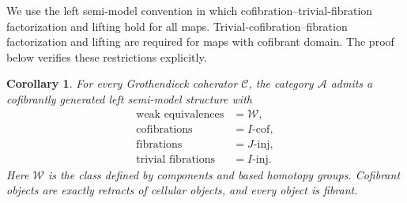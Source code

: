 \documentclass[11pt,letterpaper]{article}
\numberwithin{equation}{section}
\theoremstyle{plain}
\newtheorem{corollary}[theorem]{Corollary}
\theoremstyle{definition}
\theoremstyle{remark}
\begin{document}
We use the left semi-model convention in which
cofibration--trivial-fibration factorization and lifting hold for all maps.
Trivial-cofibration--fibration factorization and lifting are required for maps
with cofibrant domain.  The proof below verifies these restrictions
explicitly.

\begin{corollary}\label{cor:semimodel}
For every Grothendieck coherator \(\mathcal C\), the category
\(\mathcal A\) admits a cofibrantly generated left semi-model structure
with
\[
 \begin{aligned}
  \text{weak equivalences}&=\mathcal W,\\
  \text{cofibrations}&=I\text{-}\mathrm{cof},\\
  \text{fibrations}&=J\text{-}\mathrm{inj},\\
  \text{trivial fibrations}&=I\text{-}\mathrm{inj}.
 \end{aligned}
\]
Here \(\mathcal W\) is the class defined by components and based
homotopy groups.  Cofibrant objects are exactly retracts of cellular
objects, and every object is fibrant.
\end{corollary}
\end{document}
